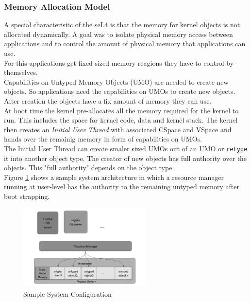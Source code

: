 \subsubsection{Memory Allocation Model} 
A special characteristic of the seL4 is that the memory for kernel objects is not allocated dynamically. A goal was to isolate physical memory access between applications and to control the amount of physical memory that applications can use. \\
For this applications get fixed sized memory reagions they have to control by themselves. \\
Capabilities on Untyped Memory Objects (UMO) are needed to create new objects. So applications need the capabilities on UMOs to create new objects. After creation the objects have a fix amount of memory they can use. \\
At boot time the kernel pre-allocates all the memory required for the kernel to run. This includes the space for kernel code, data and kernel stack. The kernel then creates an \textit{Initial User Thread} with associated CSpace and VSpace and hands over the remainig memory in form of capabilities on UMOs. \\
The Initial User Thread can create smaler sized UMOs out of an UMO or \texttt{retype} it into another object type. The creator of new objects has full authority over the objects. This "full authority" depends on the object type. \\
Figure \ref{fig:systarch} shows a sample system architecture in which a resource manager running at user-level  has the authority to the remaining untyped memory after boot strapping. 
	
	\begin{figure}[ht]
	\centering
		\includegraphics[width=0.6\textwidth]{./Pictures/MemoryAllocation.png}
	\caption[Sample system architecture]{Sample System Configuration \cite{TakeG}}
	\label{fig:systarch}
	\end{figure}	